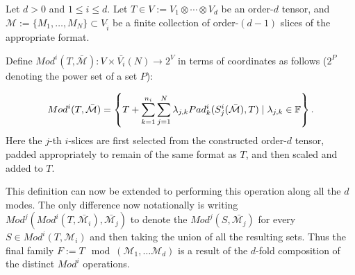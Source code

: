 \documentclass[../Lael_John_MasterThesis_Draft.tex]{subfiles}
\begin{document}
\begin{definition}\label{defn:familymoduloslices}
    Let $d > 0$ and $1 \leq i \leq d$. Let $T \in V := V_1 \otimes \cdots \otimes V_d$ be an order-$d$ tensor, and $\mathcal{M} := \{M_1, \ldots, M_N\} \subset V_{\hat{i}}$ be a finite collection of order-$(d-1)$ slices of the appropriate format. 
    
    
    Define $Mod^i(T, \bar{\mathcal{M}}): V \times \bar{V_i}(N) \to 2^{V}$ in terms of coordinates as follows ($2^P$ denoting the power set of a set $P$):
    
    $$Mod^i(T, \bar{\mathcal{M}}) = \left\{T + \sum_{k=1}^{n_i}\sum_{j=1}^N\lambda_{j,k} Pad^i_k(S^i_j(\bar{\mathcal{M}}), T) \;|\; \lambda_{j,k} \in \mathbb{F}\right\}.$$
    Here the $j$-th $i$-slices are first selected from the constructed order-$d$ tensor, padded appropriately to remain of the same format as $T$, and then scaled and added to $T$.
    
\end{definition}
This definition can now be extended to performing this operation along all the $d$ modes. The only difference now notationally is writing $Mod^j(Mod^i(T, \bar{\mathcal{M}_i}), \bar{\mathcal{M}_j})$ to denote the $Mod^j(S, \bar{\mathcal{M}_j})$ for every $S \in Mod^i(T,\mathcal{M}_i)$ and then taking the union of all the resulting sets. Thus the final family $F := T\mod(\mathcal{M}_1, \ldots \mathcal{M}_d)$ is a result of the $d$-fold composition of the distinct $Mod^i$ operations.
\end{document}
